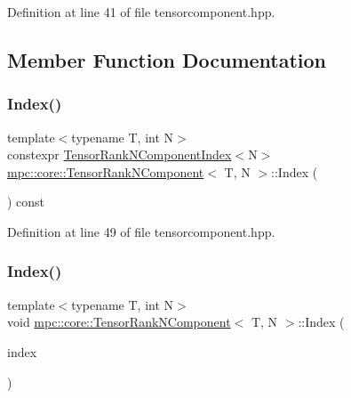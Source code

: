Definition at line 41 of file tensorcomponent.\+hpp.



\subsection{Member Function Documentation}
\mbox{\label{classmpc_1_1core_1_1_tensor_rank_n_component_a0b54eda033610a20f0c51ab47ea36324}} 
\subsubsection{\texorpdfstring{Index()}{Index()}\hspace{0.1cm}{\footnotesize\ttfamily [1/2]}}
{\footnotesize\ttfamily template$<$typename T, int N$>$ \\
constexpr \mbox{\hyperlink{classmpc_1_1core_1_1_tensor_rank_n_component_index}{Tensor\+Rank\+N\+Component\+Index}}$<$N$>$ \mbox{\hyperlink{classmpc_1_1core_1_1_tensor_rank_n_component}{mpc\+::core\+::\+Tensor\+Rank\+N\+Component}}$<$ T, N $>$\+::Index (\begin{DoxyParamCaption}{ }\end{DoxyParamCaption}) const\hspace{0.3cm}{\ttfamily [inline]}}



Definition at line 49 of file tensorcomponent.\+hpp.

\mbox{\label{classmpc_1_1core_1_1_tensor_rank_n_component_a5f398096099b3d7c7353bed10a79ad5d}} 
\subsubsection{\texorpdfstring{Index()}{Index()}\hspace{0.1cm}{\footnotesize\ttfamily [2/2]}}
{\footnotesize\ttfamily template$<$typename T, int N$>$ \\
void \mbox{\hyperlink{classmpc_1_1core_1_1_tensor_rank_n_component}{mpc\+::core\+::\+Tensor\+Rank\+N\+Component}}$<$ T, N $>$\+::Index (\begin{DoxyParamCaption}\item[{\mbox{\hyperlink{namespacempc_1_1core_a54c081f41b2475abd10182bf023805d2}{mpc\+::core\+::\+Tensor\+Rank4\+Component\+Index}}}]{index }\end{DoxyParamCaption})\hspace{0.3cm}{\ttfamily [inline]}}



